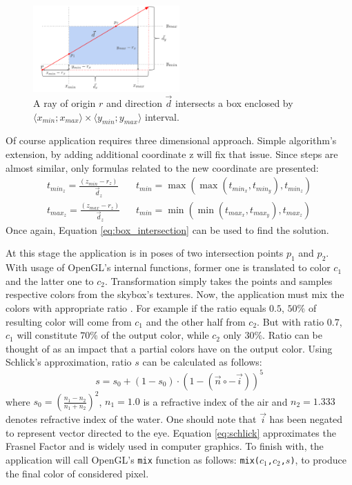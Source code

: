 \documentclass{report}
\begin{document}
\begin{figure}[H] 
    \centering
    \includegraphics[width=0.5\textwidth]{images/box_intersection.pdf}
    \caption{A ray of origin $r$ and direction $\vec{d}$ intersects a box enclosed by $\langle x_{min} ; x_{max} \rangle \times \langle y_{min} ; y_{max} \rangle$ interval.}
    \label{fig:box_intersection}
\end{figure}

Of course application requires three dimensional approach. Simple algorithm's extension, by adding additional coordinate z will fix that issue. Since steps are almost similar, only formulas related to the new coordinate are presented:
\begin{align*}
t_{min_{z}} = \frac{(z_{min} - r_z)}{\vec{d}_z} & \; \; \; t_{min} = \max (\max (t_{min_x} , t_{min_y}), t_{min_z} )\\
t_{max_{z}} = \frac{(z_{max} - r_z)}{\vec{d}_z} & \; \; \; t_{min} = \min (\min (t_{max_x} , t_{max_y}), t_{max_z} )
\end{align*}
Once again, Equation \ref{eq:box_intersection} can be used to find the solution. 

At this stage the application is in poses of two intersection points $p_1$ and $p_2$. With usage of OpenGL's internal functions, former one is translated to color $c_1$ and the latter one to $c_2$. Transformation simply takes the points and samples respective colors from the skybox's textures. Now, the application must mix the colors with appropriate ratio . For example if the ratio equals $0.5$, $50\%$ of resulting color will come from $c_1$ and the other half from $c_2$. But with ratio $0.7$, $c_1$ will constitute $70\%$ of the output color, while $c_2$ only $30 \%$. Ratio can be thought of as an impact that a partial colors have on the output color. Using Schlick's approximation, ratio $s$ can be calculated as follows:
\begin{equation} \label{eq:schlick}
s = s_0 + (1 - s_0) \cdot (1 - (\vec{n} \circ -\vec{i}))^{5}
\end{equation}
where $s_0 = (\frac{n_1 - n_2}{n_1 + n_2})^{2}$, $n_1 = 1.0$ is a refractive index of the air and $n_2 = 1.333$ denotes refractive index of the water. One should note that $\vec{i}$ has been negated to represent vector directed to the eye. Equation \ref{eq:schlick} approximates the Frasnel Factor and is widely used in computer graphics. To finish with, the application will call OpenGL's \texttt{mix} function as follows: \texttt{mix($c_1$,$c_2$,$s$)}, to produce the final color of considered pixel.
\end{document}
